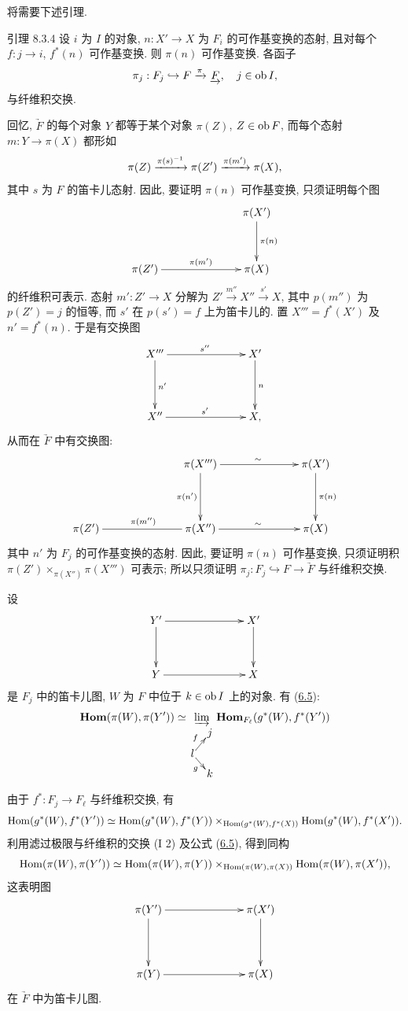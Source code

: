 将需要下述引理.

\begin{enonce*}{引理 8.3.4}
设 $i$ 为 $I$ 的对象,
$n:X'\to X$ 为 $F_i$ 的可作基变换的态射,
且对每个 $f:j\to i$, $f^{\ast}(n)$ 可作基变换.
则 $\pi(n)$ 可作基变换.
各函子
$$
\pi_j:F_j\hookrightarrow F\xrightarrow{\pi}\underrightarrow{F},
\quad j\in\operatorname{ob} I{},
$$
与纤维积交换.
\end{enonce*}

回忆, $\underrightarrow{F}$ 的每个对象 $Y$
都等于某个对象 $\pi(Z)$, $Z\in\operatorname{ob} F$,
而每个态射 $m:Y\to\pi(X)$ 都形如
$$
\pi(Z)\xrightarrow{\pi(s)^{-1}}\pi(Z')
\xrightarrow{\pi(m')}\pi(X){},
$$
其中 $s$ 为 $F$ 的笛卡儿态射.
因此, 要证明 $\pi(n)$ 可作基变换,\pageoriginale{}
只须证明每个图
\[
\xymatrix@C=2.5cm@R=1.25cm{
                           &\pi(X')\ar[d]^{\pi(n)}\\
\pi(Z')\ar[r]^{\pi(m')}&\pi(X)
}
\]
的纤维积可表示.
态射 $m':Z'\to X$ 分解为
$Z'\xrightarrow{m''}X''\xrightarrow{s'}X$,
其中 $p(m'')$ 为 $p(Z')=j$ 的恒等,
而 $s'$ 在 $p(s')=f$ 上为笛卡儿的.
置 $X'''=f^{\ast}(X')$ 及 $n'=f^{\ast}(n)$.
于是有交换图
\[
\xymatrix@C=2.5cm@R=1.5cm{
X'''\ar[r]^{s''}\ar[d]^{n'}&X'\ar[d]^{n}\\
X''\ar[r]^{s'}&X,
}
\]
从而在 $\underrightarrow{F}$ 中有交换图:
\[
\xymatrix@C=2.5cm@R=1.5cm{
        &\pi(X''')\ar[r]^{\sim}\ar[d]_{\pi(n')}&\pi(X')\ar[d]^{\pi(n)}\\
\pi(Z')\ar@{-}[r]^{\pi(m'')}&\pi(X'')\ar[r]^{\sim}&\pi(X)
}
\]
其中 $n'$ 为 $F_j$ 的可作基变换的态射.
因此, 要证明 $\pi(n)$ 可作基变换,
只须证明积 $\pi(Z')\times_{\pi(X'')}\pi(X''')$ 可表示;
所以只须证明 $\pi_j:F_j\hookrightarrow F\to\underrightarrow{F}$
与纤维积交换.

设
\[
\xymatrix@C=2.5cm@R=1.25cm{
Y'\ar[r]\ar[d]&X'\ar[d]\\
Y\ar[r]&X
}
\]
是 $F_j$ 中的笛卡儿图,
$W$ 为 $F$ 中位于 $k\in\operatorname{ob} I$ 上的对象.
有 (\hyperref[VI.prop6.5]{6.5}):
\def\labelstyle{\scriptstyle}
$$\displaystyle{\Hhom(\pi(W),\pi(Y'))\simeq\mathop{\varinjlim_{
\xymatrix@R=.3cm@C=.3cm@M=.05cm{
            &j\\
        l\ar[ru]^{f}\ar[rd]_{g}&\\
            &k
}}}\Hhom_{F_{\ell}}(g^{\ast}(W),f^{\ast}(Y'))}$$

由于\pageoriginale{} $f^{\ast}:F_j\to F_{\ell}$ 与纤维积交换, 有
$$
\operatorname{Hom}(g^{\ast}(W),f^{\ast}(Y'))\simeq
\operatorname{Hom}(g^{\ast}(W),f^{\ast}(Y))
\times_{\operatorname{Hom}(g^{\ast}(W),f^{\ast}(X))}
\operatorname{Hom}(g^{\ast}(W),f^{\ast}(X')).
$$
利用滤过极限与纤维积的交换 (I 2)
及公式 (\hyperref[VI.prop6.5]{6.5}), 得到同构
$$
\operatorname{Hom}(\pi(W),\pi(Y'))\simeq\operatorname{Hom}(\pi(W),\pi(Y))
\times_{\operatorname{Hom}(\pi(W),\pi(X))}\operatorname{Hom}(\pi(W),\pi(X')){},
$$
这表明图
\[
\xymatrix@C=2.5cm@R=1.5cm{
\pi(Y')\ar[r]\ar[d]&\pi(X')\ar[d]\\
\pi(Y)\ar[r]&\pi(X)
}
\]
在 $\underrightarrow{F}$ 中为笛卡儿图.


